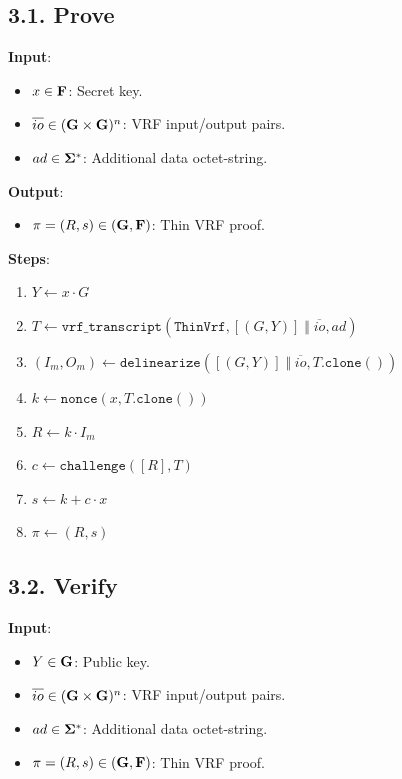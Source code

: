 \documentclass[
]{article}
\providecommand{\tightlist}{%
  \setlength{\itemsep}{0pt}\setlength{\parskip}{0pt}}
\begin{document}
\subsection{3.1. Prove}\label{prove-1}

\textbf{Input}:

\begin{itemize}
\tightlist
\item
  \(x \in \bold{F}\): Secret key.
\item
  \(\overline{io} \in (\bold{G}\times \bold{G})^n\): VRF input/output
  pairs.
\item
  \(ad \in \bold{\Sigma}^*\): Additional data octet-string.
\end{itemize}

\textbf{Output}:

\begin{itemize}
\tightlist
\item
  \(\pi = (R, s) \in (\bold{G}, \bold{F})\): Thin VRF proof.
\end{itemize}

\textbf{Steps}:

\begin{enumerate}
\def\labelenumi{\arabic{enumi}.}
\tightlist
\item
  \(Y \gets x \cdot G\)
\item
  \(T \gets \texttt{vrf\_transcript}(\texttt{ThinVrf}, [(G, Y)] \;\Vert\; \overline{io}, ad)\)
\item
  \((I_m, O_m) \gets \texttt{delinearize}([(G, Y)] \;\Vert\; \overline{io}, T.\texttt{clone}())\)
\item
  \(k \gets \texttt{nonce}(x, T.\texttt{clone}())\)
\item
  \(R \gets k \cdot I_m\)
\item
  \(c \gets \texttt{challenge}([R], T)\)
\item
  \(s \gets k + c \cdot x\)
\item
  \(\pi \gets (R, s)\)
\end{enumerate}

\subsection{3.2. Verify}\label{verify-1}

\textbf{Input}:

\begin{itemize}
\tightlist
\item
  \(Y \in \bold{G}\): Public key.
\item
  \(\overline{io} \in (\bold{G}\times \bold{G})^n\): VRF input/output
  pairs.
\item
  \(ad \in \bold{\Sigma}^*\): Additional data octet-string.
\item
  \(\pi = (R, s) \in (\bold{G}, \bold{F})\): Thin VRF proof.
\end{itemize}
\end{document}
